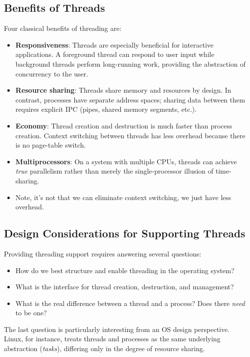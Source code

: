 \documentclass[11pt]{article}
\begin{document}
\subsection{Benefits of Threads}

Four classical benefits of threading are:

\begin{itemize}
    \item \textbf{Responsiveness}: Threads are especially beneficial for interactive applications. A foreground thread can respond to user input while background threads perform long-running work, providing the abstraction of concurrency to the user.
    \item \textbf{Resource sharing}: Threads share memory and resources by design. In contrast, processes have separate address spaces; sharing data between them requires explicit IPC (pipes, shared memory segments, etc.).
    \item \textbf{Economy}: Thread creation and destruction is much faster than process creation. Context switching between threads has less overhead because there is no page-table switch.
    \item \textbf{Multiprocessors}: On a system with multiple CPUs, threads can achieve \emph{true} parallelism rather than merely the single-processor illusion of time-sharing.
    \item Note, it's not that we can eliminate context switching, we just have less overhead.
\end{itemize}

\subsection{Design Considerations for Supporting Threads}

Providing threading support requires answering several questions:
\begin{itemize}
    \item How do we best structure and enable threading in the operating system?
    \item What is the interface for thread creation, destruction, and management?
    \item What is the real difference between a thread and a process? Does there \emph{need} to be one?
\end{itemize}

The last question is particularly interesting from an OS design perspective. Linux, for instance, treats threads and processes as the same underlying abstraction (\emph{tasks}), differing only in the degree of resource sharing.
\end{document}

